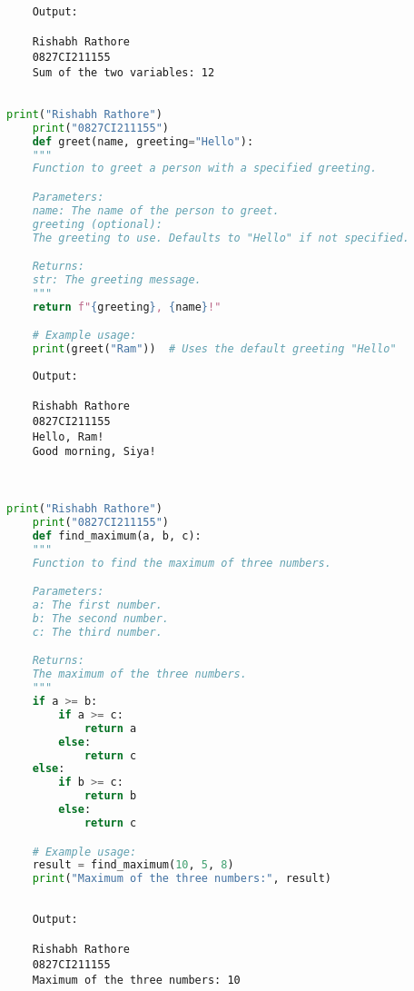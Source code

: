 \documentclass{report}
\begin{document}
\begin{verbatim}
	Output:

	Rishabh Rathore
	0827CI211155
	Sum of the two variables: 12


\end{verbatim}


\bigskip


\sol 
\begin{lstlisting}[language=Python]
	print("Rishabh Rathore")
	print("0827CI211155")
	def greet(name, greeting="Hello"):
    """
    Function to greet a person with a specified greeting.

    Parameters:
    name: The name of the person to greet.
    greeting (optional): 
	The greeting to use. Defaults to "Hello" if not specified.

    Returns:
    str: The greeting message.
    """
    return f"{greeting}, {name}!"

	# Example usage:
	print(greet("Ram"))  # Uses the default greeting "Hello"

\end{lstlisting}

\begin{verbatim}
	Output:

	Rishabh Rathore
	0827CI211155
	Hello, Ram!
	Good morning, Siya!
	
	
\end{verbatim}


\bigskip


\sol 
\begin{lstlisting}[language=Python]
	print("Rishabh Rathore")
	print("0827CI211155")
	def find_maximum(a, b, c):
    """
    Function to find the maximum of three numbers.

    Parameters:
    a: The first number.
    b: The second number.
    c: The third number.

    Returns:
    The maximum of the three numbers.
    """
    if a >= b:
        if a >= c:
            return a
        else:
            return c
    else:
        if b >= c:
            return b
        else:
            return c

	# Example usage:
	result = find_maximum(10, 5, 8)
	print("Maximum of the three numbers:", result)
  

\end{lstlisting}

\begin{verbatim}
	Output:

	Rishabh Rathore
	0827CI211155
	Maximum of the three numbers: 10

\end{verbatim}
\end{document}
